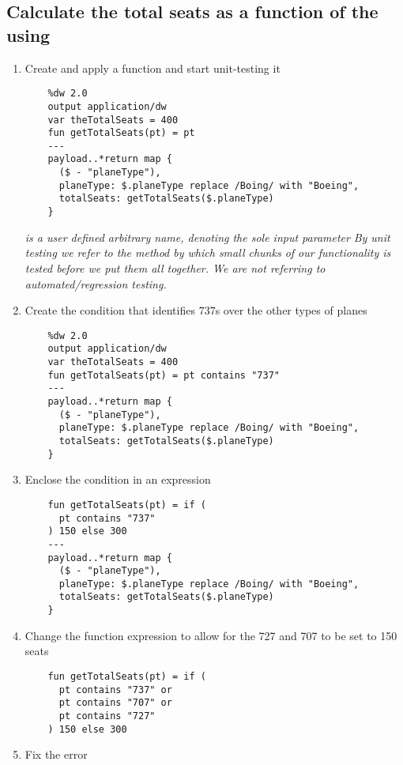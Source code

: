 \subsection{Calculate the total seats as a function of the  using }
\begin{enumerate}[resume*]
\item Create and apply a function and start unit-testing it
  \begin{verbatim}
    %dw 2.0
    output application/dw
    var theTotalSeats = 400
    fun getTotalSeats(pt) = pt
    ---
    payload..*return map {
      ($ - "planeType"),
      planeType: $.planeType replace /Boing/ with "Boeing",
      totalSeats: getTotalSeats($.planeType)
    }
  \end{verbatim}
  \emph{
     is a user defined arbitrary name, denoting the sole input parameter
  }
  \newline
  \emph{
    By unit testing we refer to the method by which small chunks of our functionality is tested before we put them all together.  We are not referring to automated/regression testing.
  }
\item Create the condition that identifies 737s over the other types of planes
  \begin{verbatim}
    %dw 2.0
    output application/dw
    var theTotalSeats = 400
    fun getTotalSeats(pt) = pt contains "737"
    ---
    payload..*return map {
      ($ - "planeType"),
      planeType: $.planeType replace /Boing/ with "Boeing",
      totalSeats: getTotalSeats($.planeType)
    }
  \end{verbatim}
\item Enclose the condition in an  expression
  \begin{verbatim}
    fun getTotalSeats(pt) = if (
      pt contains "737"
    ) 150 else 300
    ---
    payload..*return map {
      ($ - "planeType"),
      planeType: $.planeType replace /Boing/ with "Boeing",
      totalSeats: getTotalSeats($.planeType)
    }
  \end{verbatim}
\item Change the function expression to allow for the 727 and 707 to be set to 150 seats
  \begin{verbatim}
    fun getTotalSeats(pt) = if (
      pt contains "737" or
      pt contains "707" or
      pt contains "727"
    ) 150 else 300
  \end{verbatim}
\item Fix the error 
  \begin{verbatim}

\end{verbatim}
\end{enumerate}

